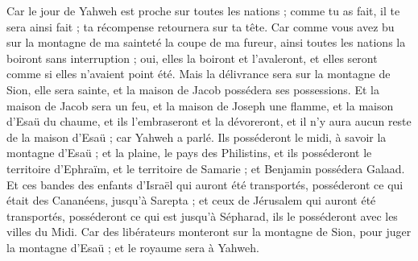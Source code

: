 \begin{multicols}{2}
Car le jour de Yahweh est proche sur toutes les nations ; comme tu as fait, il te sera ainsi fait ; ta récompense retournera sur ta tête.
Car comme vous avez bu sur la montagne de ma sainteté la coupe de ma fureur, ainsi toutes les nations la boiront sans interruption ; oui, elles la boiront et l'avaleront, et elles seront comme si elles n'avaient point été.
Mais la délivrance sera sur la montagne de Sion, elle sera sainte, et la maison de Jacob possédera ses possessions.
Et la maison de Jacob sera un feu, et la maison de Joseph une flamme, et la maison d’Esaü du chaume, et ils l’embraseront et la dévoreront, et il n’y aura aucun reste de la maison d’Esaü ; car Yahweh a parlé.
Ils posséderont le midi, à savoir la montagne d'Esaü ; et la plaine, le pays des Philistins, et ils posséderont le territoire d'Ephraïm, et le territoire de Samarie ; et Benjamin possédera Galaad.
Et ces bandes des enfants d'Israël qui auront été transportés, posséderont ce qui était des Cananéens, jusqu'à Sarepta ; et ceux de Jérusalem qui auront été transportés, posséderont ce qui est jusqu'à Sépharad, ils le posséderont avec les villes du Midi.
Car des libérateurs monteront sur la montagne de Sion, pour juger la montagne d'Esaü ; et le royaume sera à Yahweh.
\PPE{}
\end{multicols}
